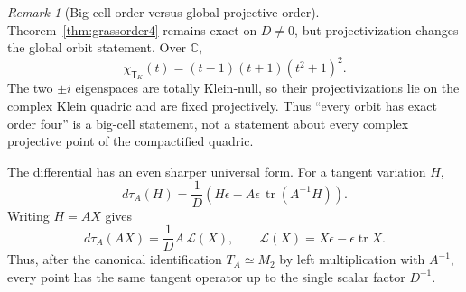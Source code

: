 \documentclass[11pt]{article}
\theoremstyle{definition}\newtheorem{definition}[theorem]{Definition}
\theoremstyle{remark}\newtheorem{remark}[theorem]{Remark}\newtheorem{conjecture}[theorem]{Conjecture}
\begin{document}
\begin{remark}[Big-cell order versus global projective order]
Theorem~\ref{thm:grassorder4} remains exact on $D\neq0$, but projectivization changes the global orbit statement. Over $\mathbb C$,
\begin{equation}
 \chi_{\mathsf T_K}(t)=(t-1)(t+1)(t^2+1)^2.
\end{equation}
The two $\pm i$ eigenspaces are totally Klein-null, so their projectivizations lie on the complex Klein quadric and are fixed projectively. Thus ``every orbit has exact order four'' is a big-cell statement, not a statement about every complex projective point of the compactified quadric.
\end{remark}

The differential has an even sharper universal form. For a tangent variation $H$,
\begin{equation}\label{eq:dtau}
 d\tau_A(H)
 =\frac1D\left(H\epsilon-A\epsilon\,\operatorname{tr}(A^{-1}H)\right).
\end{equation}
Writing $H=AX$ gives
\begin{equation}\label{eq:universalL}
 d\tau_A(AX)=\frac1D A\,\mathcal L(X),
 \qquad
 \mathcal L(X)=X\epsilon-\epsilon\operatorname{tr}X.
\end{equation}
Thus, after the canonical identification $T_A\simeq M_2$ by left multiplication with $A^{-1}$, every point has the same tangent operator up to the single scalar factor $D^{-1}$.
\end{document}
